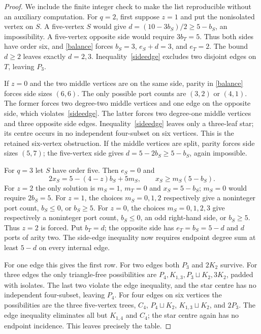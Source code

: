 \documentclass[11pt]{article}
\newcommand{\sq}{\sqcup}
\begin{document}
\begin{proof}
We include the finite integer check to make the list reproducible without
an auxiliary computation. For $q=2$, first suppose $z=1$ and put the
nonisolated vertex on $S$. A five-vertex $S$ would give
$d=(10-3b_S)/2\geq5-b_S$, an impossibility. A five-vertex opposite
side would require $3b_T=5$. Thus both sides have order six, and
\eqref{balance} forces $b_S=3$, $e_S+d=3$, and $e_T=2$.
The bound $d\geq2$ leaves exactly $d=2,3$.
Inequality~\eqref{sideedge} excludes two disjoint edges on $T$, leaving
$P_3$.

If $z=0$ and the two middle vertices are on the same side, parity in
\eqref{balance} forces side sizes $(6,6)$. The only possible port counts
are $(3,2)$ or $(4,1)$. The former forces two degree-two middle vertices
and one edge on the opposite side, which violates~\eqref{sideedge}.
The latter forces two degree-one middle vertices and three opposite
side edges. Inequality~\eqref{sideedge} leaves only a three-leaf star;
its centre occurs in no independent four-subset on six vertices.
This is the retained six-vertex obstruction. If the middle vertices
are split, parity forces side sizes $(5,7)$; the five-vertex side gives
$d=5-2b_S\geq5-b_S$, again impossible.

For $q=3$ let $S$ have order five. Then $e_S=0$ and
\[
 2x_S=5-(4-z)b_S+5m_S,\qquad
 x_S\geq m_S(5-b_S).
\]
For $z=2$ the only solution is $m_S=1$, $m_T=0$ and
$x_S=5-b_S$; $m_S=0$ would require $2b_S=5$.
For $z=1$, the choices $m_S=0,1,2$ respectively give a noninteger
port count, $b_S\leq0$, or $b_S\geq5$. For $z=0$, the choices
$m_S=0,1,2,3$ give respectively a noninteger port count, $b_S\leq0$,
an odd right-hand side, or $b_S\geq5$. Thus $z=2$ is forced.
Put $b_T=d$; the opposite side has $e_T=b_S=5-d$ and $d$ ports of
arity two. The side-edge inequality now requires endpoint degree sum
at least $5-d$ on every internal edge.

For one edge this gives the first row. For two edges both $P_3$ and
$2K_2$ survive. For three edges the only triangle-free possibilities
are $P_4,K_{1,3},P_3\sq K_2,3K_2$, padded with isolates. The last two
violate the edge inequality, and the star centre has no independent
four-subset, leaving $P_4$. For four edges on six vertices the possibilities
are the three five-vertex trees, $C_4$, $P_4\sq K_2$,
$K_{1,3}\sq K_2$, and $2P_3$. The edge inequality eliminates all but
$K_{1,4}$ and $C_4$; the star centre again has no endpoint incidence.
This leaves precisely the table.
\end{proof}
\end{document}
